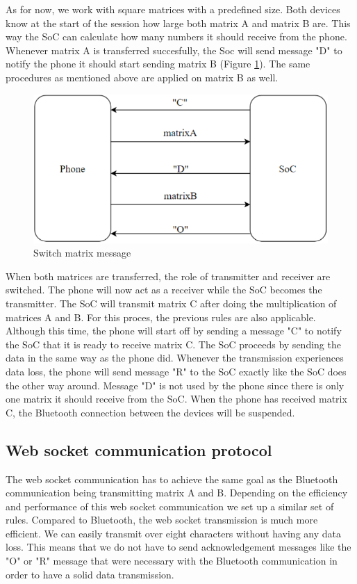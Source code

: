 \documentclass[a4paper, 11pt]{report}
\begin{document}
As for now, we work with square matrices with a predefined size. Both devices know at the start of the session how large both matrix A and matrix B are. This way the SoC can calculate how many numbers it should receive from the phone. Whenever matrix A is transferred succesfully, the Soc will send message "D" to notify the phone it should start sending matrix B (Figure \ref{fig:shiftMatrix}). The same procedures as mentioned above are applied on matrix B as well.

\begin{figure}[ht]
\centering
\includegraphics[scale=0.7]{images/ShiftMatrix.pdf}
\caption{Switch matrix message}\label{fig:shiftMatrix}
\end{figure}

When both matrices are transferred, the role of transmitter and receiver are switched. The phone will now act as a receiver while the SoC becomes the transmitter. The SoC will transmit matrix C after doing the multiplication of matrices A and B. For this proces, the previous rules are also applicable. Although this time, the phone will start off by sending a message "C" to notify the SoC that it is ready to receive matrix C. The SoC proceeds by sending the data in the same way as the phone did. Whenever the transmission experiences data loss, the phone will send message "R" to the SoC exactly like the SoC does the other way around.
Message "D" is not used by the phone since there is only one matrix it should receive from the SoC. When the phone has received matrix C, the Bluetooth connection between the devices will be suspended.

	\subsection{Web socket communication protocol}\label{subsec:websocketProtocol}
The web socket communication has to achieve the same goal as the Bluetooth communication being transmitting matrix A and B. Depending on the efficiency and performance of this web socket communication we set up a similar set of rules. Compared to Bluetooth, the web socket transmission is much more efficient. We can easily transmit over eight characters without having any data loss. This means that we do not have to send acknowledgement messages like the "O" or "R" message that were necessary with the Bluetooth communication in order to have a solid data transmission.
\end{document}
